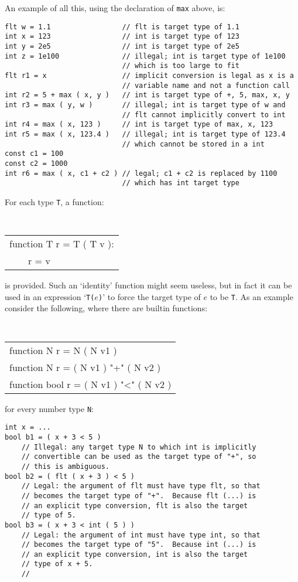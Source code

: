 \documentclass[12pt]{article}
\newenvironment{indpar}[1][0.3in]%
	{\begin{list}{}%
		     {\setlength{\itemsep}{0in}%
		      \setlength{\topsep}{0in}%
		      \setlength{\parsep}{1ex}%
		      \setlength{\labelwidth}{#1}%
		      \setlength{\leftmargin}{#1}%
		      \addtolength{\leftmargin}{\labelsep}}%
	 \item}%
	{\end{list}}
\begin{document}
An example of all this, using the declaration of {\tt max} above, is:

\begin{indpar}\begin{verbatim}
flt w = 1.1                 // flt is target type of 1.1
int x = 123                 // int is target type of 123
int y = 2e5                 // int is target type of 2e5
int z = 1e100               // illegal; int is target type of 1e100
                            // which is too large to fit
flt r1 = x                  // implicit conversion is legal as x is a
                            // variable name and not a function call
int r2 = 5 + max ( x, y )   // int is target type of +, 5, max, x, y
int r3 = max ( y, w )       // illegal; int is target type of w and
                            // flt cannot implicitly convert to int
int r4 = max ( x, 123 )     // int is target type of max, x, 123
int r5 = max ( x, 123.4 )   // illegal; int is target type of 123.4
                            // which cannot be stored in a int
const c1 = 100
const c2 = 1000
int r6 = max ( x, c1 + c2 ) // legal; c1 + c2 is replaced by 1100
                            // which has int target type
\end{verbatim}\end{indpar}

For each type {\tt T}, a function:
\begin{center} \tt
\begin{tabular}{l}
function T r = T ( T v ): \\
~~~~r = v
\end{tabular}
\end{center}
is provided.  Such an `identity' function might seem useless,
but in fact it can be used in an expression `{\tt T($e$)}' to
force the target type of $e$ to be {\tt T}.  As an example
consider the following, where there are builtin functions:
\begin{center} \tt
\begin{tabular}{l}
function N r = N ( N v1 ) \\
function N r = ( N v1 ) "+" ( N v2 ) \\
function bool r = ( N v1 ) "<" ( N v2 ) \\
\end{tabular}
\end{center}
for every number type {\tt N}:

\begin{indpar}\begin{verbatim}
int x = ...
bool b1 = ( x + 3 < 5 )
    // Illegal: any target type N to which int is implicitly
    // convertible can be used as the target type of "+", so
    // this is ambiguous.
bool b2 = ( flt ( x + 3 ) < 5 )
    // Legal: the argument of flt must have type flt, so that
    // becomes the target type of "+".  Because flt (...) is
    // an explicit type conversion, flt is also the target
    // type of 5.
bool b3 = ( x + 3 < int ( 5 ) )
    // Legal: the argument of int must have type int, so that
    // becomes the target type of "5".  Because int (...) is
    // an explicit type conversion, int is also the target
    // type of x + 5.
    //
\end{verbatim}\end{indpar}
\end{document}
